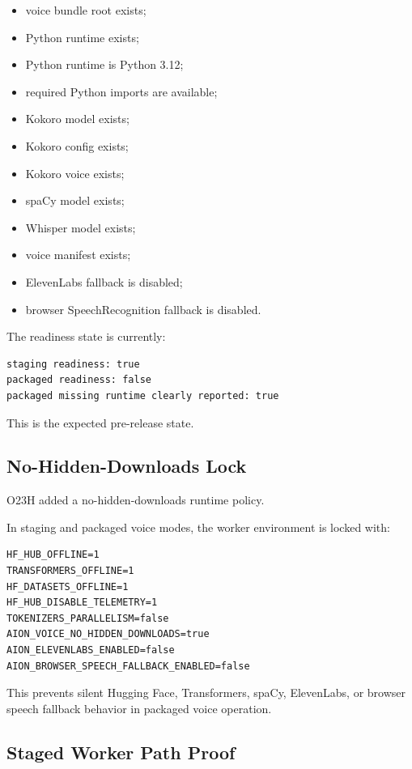 \begin{itemize}
  \item voice bundle root exists;
  \item Python runtime exists;
  \item Python runtime is Python 3.12;
  \item required Python imports are available;
  \item Kokoro model exists;
  \item Kokoro config exists;
  \item Kokoro voice exists;
  \item spaCy model exists;
  \item Whisper model exists;
  \item voice manifest exists;
  \item ElevenLabs fallback is disabled;
  \item browser SpeechRecognition fallback is disabled.
\end{itemize}

The readiness state is currently:

\begin{verbatim}
staging readiness: true
packaged readiness: false
packaged missing runtime clearly reported: true
\end{verbatim}

This is the expected pre-release state.

\subsection{No-Hidden-Downloads Lock}

O23H added a no-hidden-downloads runtime policy.

In staging and packaged voice modes, the worker environment is locked with:

\begin{verbatim}
HF_HUB_OFFLINE=1
TRANSFORMERS_OFFLINE=1
HF_DATASETS_OFFLINE=1
HF_HUB_DISABLE_TELEMETRY=1
TOKENIZERS_PARALLELISM=false
AION_VOICE_NO_HIDDEN_DOWNLOADS=true
AION_ELEVENLABS_ENABLED=false
AION_BROWSER_SPEECH_FALLBACK_ENABLED=false
\end{verbatim}

This prevents silent Hugging Face, Transformers, spaCy, ElevenLabs, or browser speech fallback behavior in packaged voice operation.

\subsection{Staged Worker Path Proof}

